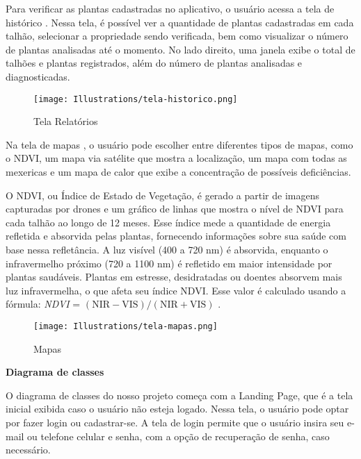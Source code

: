 Para verificar as plantas cadastradas no aplicativo, o usuário acessa a tela de histórico . Nessa tela, é possível ver a quantidade de plantas cadastradas em cada talhão, selecionar a propriedade sendo verificada, bem como visualizar o número de plantas analisadas até o momento. No lado direito, uma janela exibe o total de talhões e plantas registrados, além do número de plantas analisadas e diagnosticadas.

\begin{figure}[H]
\centering
\caption{Tela Relatórios}
\texttt{[image: Illustrations/tela-historico.png]}
\label{fig:tela-relatorios}
\end{figure}

Na tela de mapas , o usuário pode escolher entre diferentes tipos de mapas, como o NDVI, um mapa via satélite que mostra a localização, um mapa com todas as mexericas e um mapa de calor que exibe a concentração de possíveis deficiências.

O NDVI, ou Índice de Estado de Vegetação, é gerado a partir de imagens capturadas por drones e um gráfico de linhas que mostra o nível de NDVI para cada talhão ao longo de 12 meses. Esse índice mede a quantidade de energia refletida e absorvida pelas plantas, fornecendo informações sobre sua saúde com base nessa refletância. A luz visível (400 a 720 nm) é absorvida, enquanto o infravermelho próximo (720 a 1100 nm) é refletido em maior intensidade por plantas saudáveis. Plantas em estresse, desidratadas ou doentes absorvem mais luz infravermelha, o que afeta seu índice NDVI. Esse valor é calculado usando a fórmula: \textit{NDVI} = \((\text{NIR} - \text{VIS}) / (\text{NIR} + \text{VIS})\) \cite{ResultadoNDVIArtigo, ResultadoNDVISite}.

\begin{figure}[H]
\centering
\caption{Mapas}
\texttt{[image: Illustrations/tela-mapas.png]}
\label{fig:tela-mapas}
\end{figure}

\textbf{Diagrama de classes}

O diagrama de classes do nosso projeto  começa com a Landing Page, que é a tela inicial exibida caso o usuário não esteja logado. Nessa tela, o usuário pode optar por fazer login ou cadastrar-se. A tela de login permite que o usuário insira seu e-mail ou telefone celular e senha, com a opção de recuperação de senha, caso necessário.

